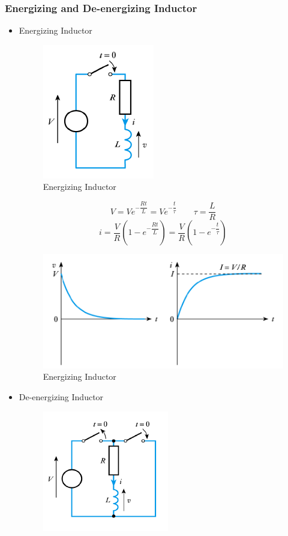 \documentclass[UTF8]{article}
\begin{document}
\subsubsection{Energizing and De-energizing Inductor}
\begin{itemize}
\item Energizing Inductor
\begin{figure}[H]
\centering
\includegraphics[scale=0.9]{b1.PNG}
\caption{Energizing Inductor}
\end{figure}
$$V=Ve^{-\dfrac{Rt}{L}}=Ve^{-\dfrac{t}{\tau}} \qquad \tau =\dfrac{L}{R}$$
$$i=\dfrac{V}{R}(1-e^{-\dfrac{Rt}{L}})=\dfrac{V}{R}(1-e^{-\dfrac{t}{\tau}})$$
\begin{figure}[H]
\centering
\includegraphics[scale=0.9]{b2.PNG}
\caption{Energizing Inductor}
\end{figure}
\item De-energizing Inductor
\begin{figure}[H]
\centering
\includegraphics[scale=0.9]{b3.PNG}

\end{figure}
\end{itemize}
\end{document}
